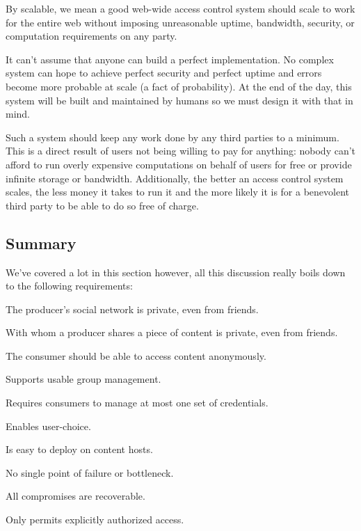 \documentclass[pdftex,12pt,a4papaer,twoside,notitlepage]{report}
\begin{document}
By scalable, we mean a good web-wide access control system should scale to work
for the entire web without imposing unreasonable uptime, bandwidth, security, or
computation requirements on any party.

It can't assume that anyone can build a perfect implementation. No complex
system can hope to achieve perfect security and perfect uptime and errors become
more probable at scale (a fact of probability). At the end of the day, this
system will be built and maintained by humans so we must design it with that in
mind.

Such a system should keep any work done by any third parties to a minimum. This
is a direct result of users not being willing to pay for anything: nobody can't
afford to run overly expensive computations on behalf of users for free or
provide infinite storage or bandwidth. Additionally, the better an access
control system scales, the less money it takes to run it and the more likely it
is for a benevolent third party to be able to do so free of charge.

\subsection{Summary}

We've covered a lot in this section however, all this discussion really boils
down to the following requirements:

\begin{compactenum}
\item The producer's social network is private, even from friends.
\item With whom a producer shares a piece of content is private, even from friends.
\item The consumer should be able to access content anonymously.
  \vspace{1em}
\item Supports usable group management.
\item Requires consumers to manage at most one set of credentials.
\item Enables user-choice.
\item Is easy to deploy on content hosts.
  \vspace{1em}
\item No single point of failure or bottleneck.
\item All compromises are recoverable.
\item Only permits explicitly authorized access.
\end{compactenum}
\end{document}
